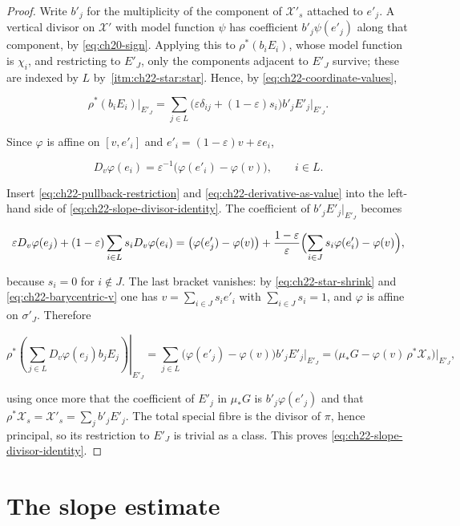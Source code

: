 \begin{proof}
Write $b'_j$ for the multiplicity of the component of
$\mathcal X'_s$ attached to $e'_j$.  A vertical divisor on
$\mathcal X'$ with model function $\psi$ has coefficient
$b'_j\psi(e'_j)$ along that component, by
\eqref{eq:ch20-sign}.  Applying this to
$\rho^*(b_iE_i)$, whose model function is $\chi_i$, and restricting to
$E'_J$, only the components adjacent to $E'_J$ survive; these are indexed
by $L$ by \,\cref{itm:ch22-star:star}.  Hence,
by \eqref{eq:ch22-coordinate-values},

\[
 \rho^*(b_iE_i)|_{E'_J}
   =\sum_{j\in L}\bigl(\varepsilon\delta_{ij}
        +(1-\varepsilon)s_i\bigr)b'_jE'_j\big|_{E'_J}.
\tag{22.41}\label{eq:ch22-pullback-restriction}
\]

Since $\varphi$ is affine on $[v,e'_i]$ and
$e'_i=(1-\varepsilon)v+\varepsilon e_i$,

\[
 D_v\varphi(e_i)
   =\varepsilon^{-1}\bigl(\varphi(e'_i)-\varphi(v)\bigr),
       \qquad i\in L .
\tag{22.42}\label{eq:ch22-derivative-as-value}
\]

Insert \eqref{eq:ch22-pullback-restriction} and
\eqref{eq:ch22-derivative-as-value} into the left-hand side of
\eqref{eq:ch22-slope-divisor-identity}.  The coefficient of
$b'_jE'_j|_{E'_J}$ becomes

\[
 \varepsilon D_v\varphi(e_j)
 +(1-\varepsilon)\sum_{i\in L}s_iD_v\varphi(e_i)
 =\bigl(\varphi(e'_j)-\varphi(v)\bigr)
 +\frac{1-\varepsilon}{\varepsilon}
   \Bigl(\sum_{i\in J}s_i\varphi(e'_i)-\varphi(v)\Bigr),
\]

because $s_i=0$ for $i\notin J$.  The last bracket vanishes: by
\eqref{eq:ch22-star-shrink} and \eqref{eq:ch22-barycentric-v} one has
$v=\sum_{i\in J}s_ie'_i$ with $\sum_{i\in J}s_i=1$, and $\varphi$ is
affine on $\sigma'_J$.  Therefore

\[
 \left.
 \rho^*\!\left(\sum_{j\in L}D_v\varphi(e_j)b_jE_j\right)\right|_{E'_J}
 =\sum_{j\in L}\bigl(\varphi(e'_j)-\varphi(v)\bigr)b'_jE'_j\big|_{E'_J}
 =\bigl(\mu_*G-\varphi(v)\,\rho^*\mathcal X_s\bigr)\big|_{E'_J},
\]

using once more that the coefficient of $E'_j$ in $\mu_*G$ is
$b'_j\varphi(e'_j)$ and that
$\rho^*\mathcal X_s=\mathcal X'_s=\sum_{j}b'_jE'_j$.  The total special
fibre is the divisor of $\pi$, hence principal, so its restriction to
$E'_J$ is trivial as a class.  This proves
\eqref{eq:ch22-slope-divisor-identity}.
\end{proof}

\section{The slope estimate}
\label{sec:ch22-slope}

